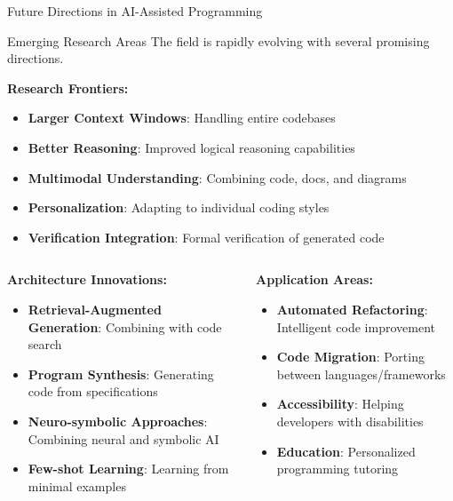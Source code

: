 \documentclass{beamer}
\begin{document}
\begin{frame}[t]{Future Directions in AI-Assisted Programming}
    \begin{block}{Emerging Research Areas}
        The field is rapidly evolving with several promising directions.
    \end{block}
    
    \textbf{Research Frontiers:}
    \begin{itemize}
        \item \textbf{Larger Context Windows}: Handling entire codebases
        \item \textbf{Better Reasoning}: Improved logical reasoning capabilities
        \item \textbf{Multimodal Understanding}: Combining code, docs, and diagrams
        \item \textbf{Personalization}: Adapting to individual coding styles
        \item \textbf{Verification Integration}: Formal verification of generated code
    \end{itemize}
    
    \begin{columns}[t]
        \begin{column}{0.5\textwidth}
            \textbf{Architecture Innovations:}
            \begin{itemize}
                \item \textbf{Retrieval-Augmented Generation}: Combining with code search
                \item \textbf{Program Synthesis}: Generating code from specifications
                \item \textbf{Neuro-symbolic Approaches}: Combining neural and symbolic AI
                \item \textbf{Few-shot Learning}: Learning from minimal examples
            \end{itemize}
        \end{column}
        \begin{column}{0.5\textwidth}
            \textbf{Application Areas:}
            \begin{itemize}
                \item \textbf{Automated Refactoring}: Intelligent code improvement
                \item \textbf{Code Migration}: Porting between languages/frameworks
                \item \textbf{Accessibility}: Helping developers with disabilities
                \item \textbf{Education}: Personalized programming tutoring
            \end{itemize}
        \end{column}
    \end{columns}
\end{frame}
\end{document}
